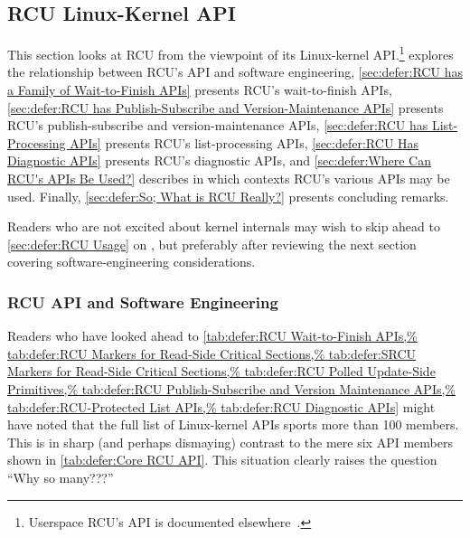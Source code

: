 
\subsection{RCU Linux-Kernel API}
\label{sec:defer:RCU Linux-Kernel API}

This section looks at RCU from the viewpoint of its Linux-kernel API\@.\footnote{
	Userspace RCU's API is documented
	elsewhere~\cite{PaulMcKenney2013LWNURCU}.}
explores the relationship between RCU's API and software engineering,
\cref{sec:defer:RCU has a Family of Wait-to-Finish APIs}
presents RCU's wait-to-finish APIs,
\cref{sec:defer:RCU has Publish-Subscribe and Version-Maintenance APIs}
presents RCU's publish-subscribe and version-maintenance APIs,
\cref{sec:defer:RCU has List-Processing APIs}
presents RCU's list-processing APIs,
\cref{sec:defer:RCU Has Diagnostic APIs}
presents RCU's diagnostic APIs, and
\cref{sec:defer:Where Can RCU's APIs Be Used?}
describes in which contexts RCU's various APIs may be used.
Finally,
\cref{sec:defer:So; What is RCU Really?}
presents concluding remarks.

Readers who are not excited about kernel internals may wish to skip
ahead to \cref{sec:defer:RCU Usage}
on ,
but preferably after reviewing the next section covering software-engineering
considerations.

\subsubsection{RCU API and Software Engineering}
\label{sec:defer:RCU API and Software Engineering}

Readers who have looked ahead to
\cref{tab:defer:RCU Wait-to-Finish APIs,%
tab:defer:RCU Markers for Read-Side Critical Sections,%
tab:defer:SRCU Markers for Read-Side Critical Sections,%
tab:defer:RCU Polled Update-Side Primitives,%
tab:defer:RCU Publish-Subscribe and Version Maintenance APIs,%
tab:defer:RCU-Protected List APIs,%
tab:defer:RCU Diagnostic APIs}
might have noted that the full list of Linux-kernel APIs sports more
than 100 members.
This is in sharp (and perhaps dismaying) contrast to the mere six
API members shown in
\cref{tab:defer:Core RCU API}.
This situation clearly raises the question ``Why so many???''

